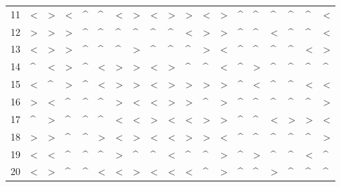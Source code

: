 \begin{tabular}{lllllllllllllllllll}
11  &  < &  > &  < &  \textasciicircum  &  \textasciicircum  &  < &  > &  < &  > &  > &  < &  > &  \textasciicircum  &  \textasciicircum  &  \textasciicircum  &  \textasciicircum  &  \textasciicircum  &  < \\
12  &  > &  > &  > &  \textasciicircum  &  \textasciicircum  &  \textasciicircum  &  \textasciicircum  &  \textasciicircum  &  \textasciicircum  &  < &  > &  > &  \textasciicircum  &  \textasciicircum  &  < &  \textasciicircum  &  \textasciicircum  &  < \\
13  &  < &  > &  > &  \textasciicircum  &  \textasciicircum  &  \textasciicircum  &  > &  \textasciicircum  &  \textasciicircum  &  \textasciicircum  &  > &  < &  \textasciicircum  &  \textasciicircum  &  \textasciicircum  &  \textasciicircum  &  < &  > \\
14  &  \textasciicircum  &  < &  > &  \textasciicircum  &  < &  > &  > &  < &  > &  \textasciicircum  &  \textasciicircum  &  < &  \textasciicircum  &  > &  \textasciicircum  &  \textasciicircum  &  \textasciicircum  &  \textasciicircum  \\
15  &  < &  \textasciicircum  &  > &  \textasciicircum  &  < &  > &  > &  < &  > &  > &  > &  > &  \textasciicircum  &  < &  \textasciicircum  &  \textasciicircum  &  < &  < \\
16  &  > &  < &  \textasciicircum  &  \textasciicircum  &  \textasciicircum  &  > &  < &  < &  > &  > &  \textasciicircum  &  > &  \textasciicircum  &  \textasciicircum  &  \textasciicircum  &  \textasciicircum  &  \textasciicircum  &  > \\
17  &  \textasciicircum  &  > &  \textasciicircum  &  \textasciicircum  &  \textasciicircum  &  < &  < &  > &  < &  < &  > &  > &  \textasciicircum  &  \textasciicircum  &  < &  > &  > &  < \\
18  &  > &  > &  \textasciicircum  &  \textasciicircum  &  > &  < &  > &  < &  < &  > &  > &  < &  \textasciicircum  &  \textasciicircum  &  \textasciicircum  &  \textasciicircum  &  \textasciicircum  &  > \\
19  &  < &  < &  \textasciicircum  &  \textasciicircum  &  \textasciicircum  &  > &  \textasciicircum  &  \textasciicircum  &  < &  \textasciicircum  &  \textasciicircum  &  > &  \textasciicircum  &  > &  \textasciicircum  &  \textasciicircum  &  < &  \textasciicircum  \\
20  &  < &  > &  \textasciicircum  &  \textasciicircum  &  < &  < &  > &  < &  < &  < &  \textasciicircum  &  > &  \textasciicircum  &  \textasciicircum  &  > &  \textasciicircum  &  \textasciicircum  &  \textasciicircum  \\

\end{tabular}
